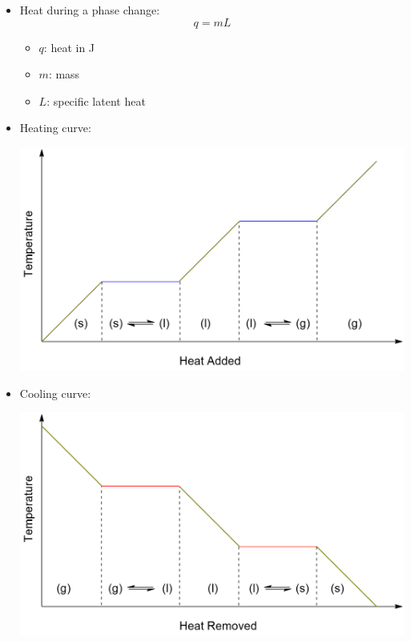 \documentclass{article}
\begin{document}
\begin{itemize}
\begin{itemize}
    \end{itemize}
    \item Heat during a phase change:
    \begin{equation*}
        q = mL
    \end{equation*}
    \begin{itemize}
        \item $q$: heat in \si{\joule}
        \item $m$: mass
        \item $L$: specific latent heat
    \end{itemize}
    \item Heating curve:
    \begin{center}
        \includegraphics[scale = 0.3]{heating_curve.png}
    \end{center}
    \item Cooling curve:
    \begin{center}
        \includegraphics[scale = 0.3]{cooling_curve.png}     
    \end{center}
\end{itemize}
\end{document}
